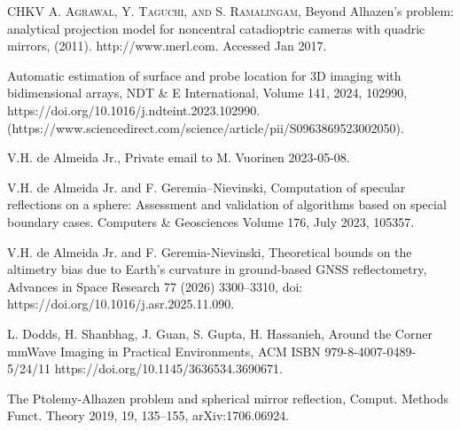 \documentclass[12pt,a4paper]{amsart}
\theoremstyle{plain}
\theoremstyle{definition}
\theoremstyle{remark}
\numberwithin{equation}{section}
\begin{document}

%
\begin{thebibliography}{CHKV}
 \textsc{A. Agrawal, Y. Taguchi, and S. Ramalingam,} 
Beyond Alhazen's problem: analytical projection model
for noncentral catadioptric cameras with quadric mirrors, (2011). 
http://www.merl.com. Accessed Jan 2017.


Automatic estimation of surface and probe location for 3D imaging with 
bidimensional arrays,
NDT \& E International,
Volume 141,
2024,
102990,
https://doi.org/10.1016/j.ndteint.2023.102990.
(https://www.sciencedirect.com/science/article/pii/S0963869523002050).


 {\sc 
V.H.  de Almeida Jr.,} Private email to M. Vuorinen 2023-05-08.



 {\sc 
V.H.  de Almeida Jr. and F.   Geremia--Nievinski,}
Computation of specular reflections on a sphere: Assessment and validation of algorithms
based on special boundary cases. Computers \& Geosciences
Volume 176, July 2023, 105357.


 {\sc 
V.H.  de Almeida Jr. 
 and F.  Geremia-Nievinski, } Theoretical bounds on the altimetry bias due to Earth's curvature in ground-based GNSS reflectometry,
Advances in Space Research  77 (2026) 3300--3310, doi: https://doi.org/10.1016/j.asr.2025.11.090.


 {\sc
L.  Dodds,
H.  Shanbhag,
J.  Guan,
S.  Gupta,
H.  Hassanieh,}
Around the Corner mmWave Imaging
in Practical Environments,
ACM ISBN 979-8-4007-0489-5/24/11
https://doi.org/10.1145/3636534.3690671.



 {The Ptolemy-Alhazen problem and spherical mirror reflection},
 {Comput. Methods Funct. Theory 2019, 19, 135--155},
{arXiv:1706.06924}.


\end{thebibliography}
\end{document}
